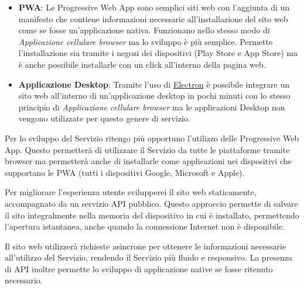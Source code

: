 \begin{itemize}
    \item \textbf{PWA}: Le Progressive Web App sono semplici siti web con l'aggiunta di un manifesto che contiene informazioni necessarie all'installazione del sito web come se fosse un'applicazione nativa. Funzionano nello stesso modo di \textit{Applicazione cellulare browser} ma lo sviluppo \`e pi\`u semplice. Permette l'installazione sia tramite i negozi dei dispositivi (Play Store e App Store) ma \`e anche possibile installarle con un click all'interno della pagina web.
    \item \textbf{Applicazione Desktop}: Tramite l'uso di \href{https://www.electronjs.org/}{Electron} \`e possibile integrare un sito web all'interno di un'applicazione desktop in pochi minuti con lo stesso principio di \textit{Applicazione cellulare browser} ma le applicazioni Desktop non vengono utilizzate per questo genere di servizio.
\end{itemize}

Per lo sviluppo del Servizio ritengo pi\`u opportuno l'utilizzo delle Progressive Web App. Questo permetter\`a di utilizzare il Servizio da tutte le piattaforme tramite browser ma permetter\`a anche di installarle come applicazioni nei dispositivi che supportano le PWA (tutti i dispositivi Google, Microsoft e Apple).

Per migliorare l'esperienza utente svilupperei il sito web staticamente, accompagnato da un servizio API pubblico. Questo approccio permette di salvare il sito integralmente nella memoria del dispositivo in cui \`e installato, permettendo l'apertura istantanea, anche quando la connessione Internet non \`e disponibile.

Il sito web utilizzer\`a richieste asincrone per ottenere le informazioni necessarie all'utilizzo del Servizio, rendendo il Servizio pi\`u fluido e responsivo. La presenza di API inoltre permette lo sviluppo di applicazione native se fosse ritenuto necessario.
